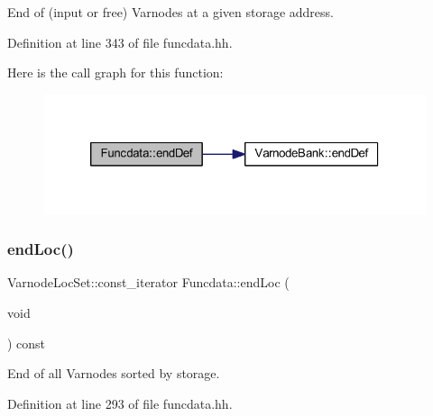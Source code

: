 End of (input or free) Varnodes at a given storage address. 



Definition at line 343 of file funcdata.\+hh.

Here is the call graph for this function\+:
\nopagebreak
\begin{figure}[H]
\begin{center}
\leavevmode
\includegraphics[width=320pt]{class_funcdata_ab112eb1f47f8e32c0018c7af989f519c_cgraph}
\end{center}
\end{figure}
\mbox{\label{class_funcdata_a49f4e57094c47d431d81545f28172c1f}} 
\subsubsection{\texorpdfstring{endLoc()}{endLoc()}\hspace{0.1cm}{\footnotesize\ttfamily [1/6]}}
{\footnotesize\ttfamily Varnode\+Loc\+Set\+::const\+\_\+iterator Funcdata\+::end\+Loc (\begin{DoxyParamCaption}\item[{void}]{ }\end{DoxyParamCaption}) const\hspace{0.3cm}{\ttfamily [inline]}}



End of all Varnodes sorted by storage. 



Definition at line 293 of file funcdata.\+hh.


